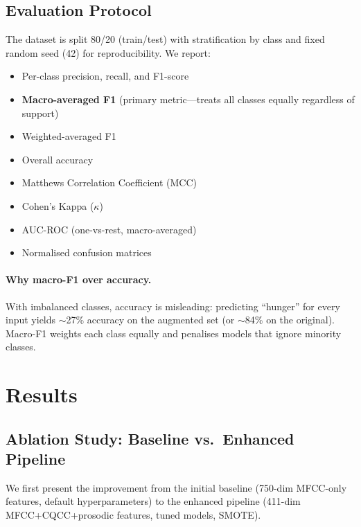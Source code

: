 \documentclass[11pt,a4paper]{article}
\begin{document}
\subsection{Evaluation Protocol}
\label{sec:eval_protocol}

The dataset is split 80/20 (train/test) with stratification by class
and fixed random seed (42) for reproducibility. We report:
\begin{itemize}[nosep]
  \item Per-class precision, recall, and F1-score
  \item \textbf{Macro-averaged F1} (primary metric---treats all classes
        equally regardless of support)
  \item Weighted-averaged F1
  \item Overall accuracy
  \item Matthews Correlation Coefficient (MCC)
  \item Cohen's Kappa ($\kappa$)
  \item AUC-ROC (one-vs-rest, macro-averaged)
  \item Normalised confusion matrices
\end{itemize}

\paragraph{Why macro-F1 over accuracy.}
With imbalanced classes, accuracy is misleading: predicting ``hunger''
for every input yields $\sim$27\% accuracy on the augmented set
(or $\sim$84\% on the original). Macro-F1 weights each class equally
and penalises models that ignore minority classes.

\section{Results}
\label{sec:results}

\subsection{Ablation Study: Baseline vs.\ Enhanced Pipeline}

We first present the improvement from the initial baseline (750-dim
MFCC-only features, default hyperparameters) to the enhanced pipeline
(411-dim MFCC+CQCC+prosodic features, tuned models, SMOTE).
\end{document}
